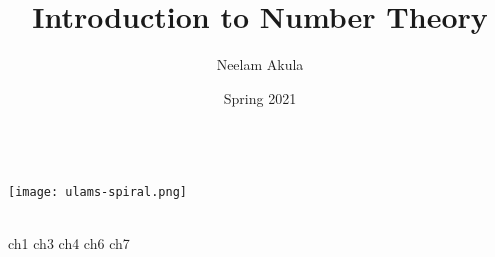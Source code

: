 \documentclass[fullpage]{article}
\title{Introduction to Number Theory}
\author{Neelam Akula}
\date{Spring 2021}
\newif\ifintro
\begin{document}
\makeatletter
    \begin{titlepage}
        \begin{center}
            {\huge \bfseries  \@title }\\[4ex]
			\texttt{[image: ulams-spiral.png]}\\[4ex]
            {\large  \@author}\\[4ex] 
            {\large \@date}
        \end{center}
    \end{titlepage}
\makeatother

\tableofcontents
\newpage

\ifintro
\section*{Introduction}
\rule{\textwidth}{1pt}
\vspace{1.5in}
\paragraph{}
    This is a compilation of notes and homeworks for MATH 406,
    Introduction to Number Theory, to aid both current and future students
    in fully understanding the material. 
    The primary text used is \emph{Elementary Number Theory}, by Kenneth H. Rosen, 6th
    Edition. While the text is not required it is an excellent resource for additional
    problems. Chapters covered from the text are 1, 3, 4, 6, 7, 9, 8, and 11 in that order. With two
    midterms following chapters 1, 3, 4 and chapters 6, 7, 9. The final is cumulative with an
    emphasis on chapters 8 and 11.
    Lastly, the course is taught by Dr. Justin Wyss-Gallifent, on his personal site there are
    brief versions of each section's lecture notes. A list of his notes can be found
    \href{https://www.math.umd.edu/~immortal/MATH406/}{here}.
\addcontentsline{toc}{section}{Introduction}
\newpage
\fi

{ch1}
\newpage
{ch3}
\newpage
{ch4}
\newpage
{ch6}
\newpage
{ch7}
\newpage
\end{document}
